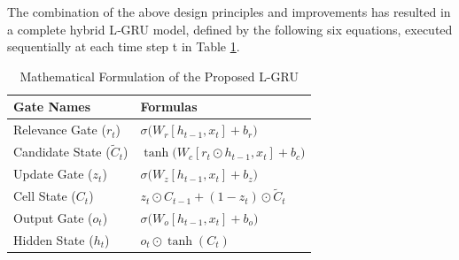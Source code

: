 \documentclass{cys}
\begin{document}
  The combination of the above design principles and improvements has resulted in a complete hybrid L‑GRU model, defined by the following six equations, executed sequentially at each time step t in Table \ref{tab: equation}.

\begin{table}[h!]
\centering
\caption{Mathematical Formulation of the Proposed L-GRU}
\begin{tabular}{|l|l|}
\hline
\textbf{Gate Names} & \textbf{Formulas} \\
\hline
Relevance Gate ($r_t$) 
& $ \sigma\big(W_r [h_{t-1}, x_t] + b_r\big) $ \\

Candidate State ($\tilde{C}_t$) 
& $ \tanh\big(W_c [r_t \odot h_{t-1}, x_t] + b_c\big) $ \\

Update Gate ($z_t$) 
& $ \sigma\big(W_z [h_{t-1}, x_t] + b_z\big) $ \\

Cell State ($C_t$) 
& $ z_t \odot C_{t-1} + (1 - z_t) \odot \tilde{C}_t $ \\

Output Gate ($o_t$) 
& $ \sigma\big(W_o [h_{t-1}, x_t] + b_o\big) $ \\

Hidden State ($h_t$) 
& $ o_t \odot \tanh(C_t) $ \\
\hline
\end{tabular}\label{tab: equation}
\end{table}



\end{document}
